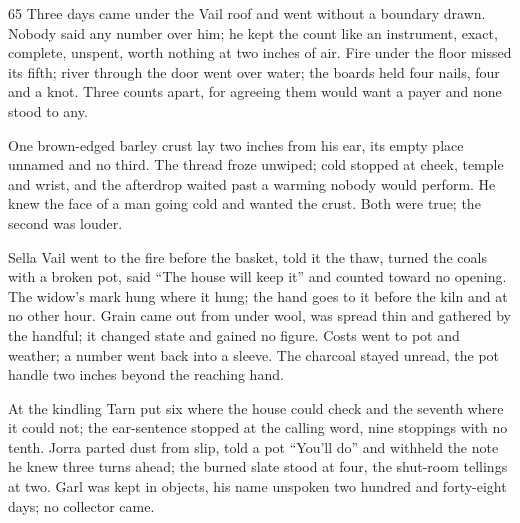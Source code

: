 
\scenebreak


\scenebreak


\scenebreak

\CRtailpiece
\begin{CRchronicle}{65}
Three days came under the Vail roof and went without a boundary drawn. Nobody said any number over him; he kept the count like an instrument, exact, complete, unspent, worth nothing at two inches of air. Fire under the floor missed its fifth; river through the door went over water; the boards held four nails, four and a knot. Three counts apart, for agreeing them would want a payer and none stood to any.

One brown-edged barley crust lay two inches from his ear, its empty place unnamed and no third. The thread froze unwiped; cold stopped at cheek, temple and wrist, and the afterdrop waited past a warming nobody would perform. He knew the face of a man going cold and wanted the crust. Both were true; the second was louder.

Sella Vail went to the fire before the basket, told it the thaw, turned the coals with a broken pot, said “The house will keep it” and counted toward no opening. The widow’s mark hung where it hung; the hand goes to it before the kiln and at no other hour. Grain came out from under wool, was spread thin and gathered by the handful; it changed state and gained no figure. Costs went to pot and weather; a number went back into a sleeve. The charcoal stayed unread, the pot handle two inches beyond the reaching hand.

At the kindling Tarn put six where the house could check and the seventh where it could not; the ear-sentence stopped at the calling word, nine stoppings with no tenth. Jorra parted dust from slip, told a pot “You’ll do” and withheld the note he knew three turns ahead; the burned slate stood at four, the shut-room tellings at two. Garl was kept in objects, his name unspoken two hundred and forty-eight days; no collector came.


\end{CRchronicle}
